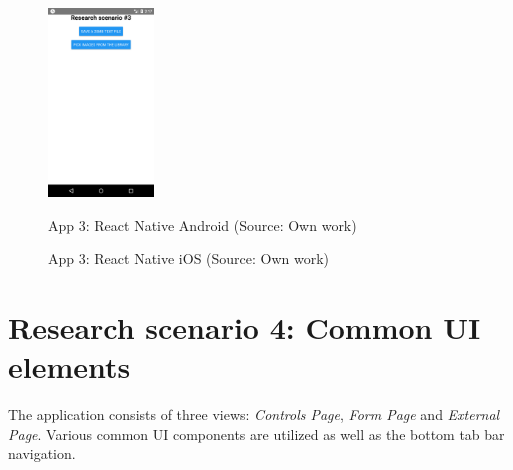 \begin{figure}[H]
\begin{minipage}{.47\textwidth}
  \centering
  \includegraphics[height=50mm]{img/app3_rn_android}
  \caption{App 3: React Native Android (Source: Own work)}
  \label{fig:app3_rn_android}
\end{minipage}
\hfill
\begin{minipage}{.47\textwidth}
  \centering
  \caption{App 3: React Native iOS (Source: Own work)}
  \label{fig:app3_rn_ios}
\end{minipage}
\end{figure}

\section{Research scenario 4: Common UI elements}

The application consists of three views: \emph{Controls Page}, \emph{Form Page} and \emph{External Page}. Various common UI components are utilized as well as the bottom tab bar navigation.

